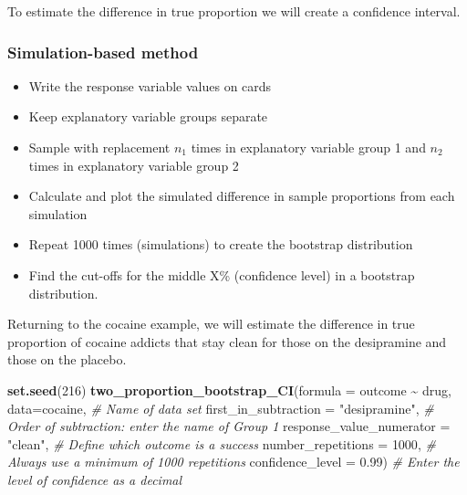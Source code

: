 \documentclass[
]{report}
\newenvironment{Shaded}{\begin{snugshade}}{\end{snugshade}}
\newcommand{\AttributeTok}[1]{\textcolor[rgb]{0.13,0.29,0.53}{#1}}
\newcommand{\CommentTok}[1]{\textcolor[rgb]{0.56,0.35,0.01}{\textit{#1}}}
\newcommand{\DecValTok}[1]{\textcolor[rgb]{0.00,0.00,0.81}{#1}}
\newcommand{\FloatTok}[1]{\textcolor[rgb]{0.00,0.00,0.81}{#1}}
\newcommand{\FunctionTok}[1]{\textcolor[rgb]{0.13,0.29,0.53}{\textbf{#1}}}
\newcommand{\NormalTok}[1]{#1}
\newcommand{\SpecialCharTok}[1]{\textcolor[rgb]{0.81,0.36,0.00}{\textbf{#1}}}
\newcommand{\StringTok}[1]{\textcolor[rgb]{0.31,0.60,0.02}{#1}}
\begin{document}
To estimate the difference in true proportion we will create a confidence interval.

\subsubsection*{Simulation-based method}\label{simulation-based-method-3}

\begin{itemize}
\item
  Write the response variable values on cards
\item
  Keep explanatory variable groups separate
\item
  Sample with replacement \(n_1\) times in explanatory variable group 1 and \(n_2\) times in explanatory variable group 2
\item
  Calculate and plot the simulated difference in sample proportions from each simulation
\item
  Repeat 1000 times (simulations) to create the bootstrap distribution
\item
  Find the cut-offs for the middle X\% (confidence level) in a bootstrap distribution.
\end{itemize}

Returning to the cocaine example, we will estimate the difference in true proportion of cocaine addicts that stay clean for those on the desipramine and those on the placebo.

\begin{Shaded}
\begin{Highlighting}[]
\FunctionTok{set.seed}\NormalTok{(}\DecValTok{216}\NormalTok{)}
\FunctionTok{two\_proportion\_bootstrap\_CI}\NormalTok{(}\AttributeTok{formula =}\NormalTok{ outcome }\SpecialCharTok{\textasciitilde{}}\NormalTok{ drug, }
        \AttributeTok{data=}\NormalTok{cocaine, }\CommentTok{\# Name of data set}
        \AttributeTok{first\_in\_subtraction =} \StringTok{"desipramine"}\NormalTok{, }\CommentTok{\# Order of subtraction: enter the name of Group 1}
        \AttributeTok{response\_value\_numerator =} \StringTok{"clean"}\NormalTok{, }\CommentTok{\# Define which outcome is a success }
        \AttributeTok{number\_repetitions =} \DecValTok{1000}\NormalTok{, }\CommentTok{\# Always use a minimum of 1000 repetitions}
        \AttributeTok{confidence\_level =} \FloatTok{0.99}\NormalTok{) }\CommentTok{\# Enter the level of confidence as a decimal}
\end{Highlighting}
\end{Shaded}
\end{document}
